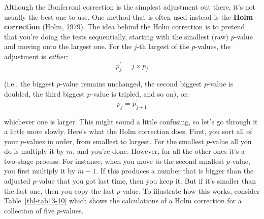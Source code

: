 \documentclass[
  a4paper,
]{book}
\begin{document}
Although the Bonferroni correction is the simplest adjustment out there,
it's not usually the best one to use. One method that is often used
instead is the \textbf{Holm correction} (Holm, 1979). The idea behind
the Holm correction is to pretend that you're doing the tests
sequentially, starting with the smallest (raw) \(p\)-value and moving
onto the largest one. For the \(j\)-th largest of the \(p\)-values, the
adjustment is \emph{either}: \[p_j^{'}=j \times p_j\]

(i.e., the biggest \(p\)-value remains unchanged, the second biggest
\(p\)-value is doubled, the third biggest \(p\)-value is tripled, and so
on), or: \[p_j^{'}=p_{j+1}^{'}\]

whichever one is larger. This might sound a little confusing, so let's
go through it a little more slowly. Here's what the Holm correction
does. First, you sort all of your \(p\)-values in order, from smallest
to largest. For the smallest \(p\)-value all you do is multiply it by
\(m\), and you're done. However, for all the other ones it's a two-stage
process. For instance, when you move to the second smallest \(p\)-value,
you first multiply it by \(m - 1\). If this produces a number that is
bigger than the adjusted \(p\)-value that you got last time, then you
keep it. But if it's smaller than the last one, then you copy the last
\(p\)-value. To illustrate how this works, consider
Table~\ref{tbl-tab13-10} which shows the calculations of a Holm
correction for a collection of five \(p\)-values.

\hypertarget{tbl-tab13-10}{}
 
  \providecommand{\huxb}[2]{\arrayrulecolor[RGB]{#1}\global\arrayrulewidth=#2pt}
  \providecommand{\huxvb}[2]{\color[RGB]{#1}\vrule width #2pt}
  \providecommand{\huxtpad}[1]{\rule{0pt}{#1}}
  \providecommand{\huxbpad}[1]{\rule[-#1]{0pt}{#1}}
\end{document}

